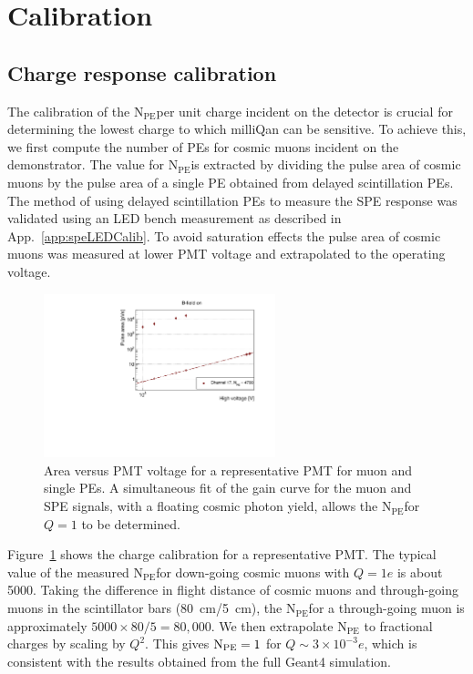\documentclass[12pt]{article}
\newcommand{\npe} {\mbox{\ensuremath{\textrm{N}_\textrm{PE}}\xspace}}
\begin{document}
\section{Calibration}

\subsection{Charge response calibration}
\label{sec:npeCalibration}
The calibration of the \npe per unit charge incident on the 
detector is crucial for determining the lowest charge to which milliQan can be sensitive. 
To achieve this, we first compute the number of PEs for cosmic muons 
incident on the demonstrator. The value for \npe is extracted by dividing the pulse area of cosmic 
muons by the pulse area of a single PE obtained from delayed scintillation PEs. The 
method of using delayed scintillation PEs to measure the SPE response was validated using 
an LED bench measurement as described in App.~\ref{app:speLEDCalib}. 
To avoid saturation effects the pulse area of cosmic muons 
was measured at lower PMT voltage and extrapolated to the operating voltage.

\begin{figure}
\centering
\includegraphics[width=0.6\textwidth]{figures/chargeCalibration.pdf}
\caption{Area versus PMT voltage for a representative PMT for muon and single PEs. A simultaneous fit of the gain curve for the muon and SPE signals, with a floating cosmic photon yield, allows the \npe for $Q=1$ to be determined.}
\label{fig:chargeCalib}
\end{figure}

Figure~\ref{fig:chargeCalib} shows the charge calibration for a representative PMT. The typical value of the 
measured \npe for down-going cosmic muons with $Q=1e$ is about 5000. Taking the difference 
in flight distance of cosmic muons and through-going muons in the scintillator bars (80~cm/5~cm), 
the \npe for a through-going muon is approximately $5000\times80/5 = 80,000$. We then extrapolate \npe 
to fractional charges by scaling by $Q^2$. This gives $\npe=1$ for $Q \sim 3\times10^{-3}e$, 
which is consistent with the results obtained from the full {\sc Geant4} simulation.
\end{document}
